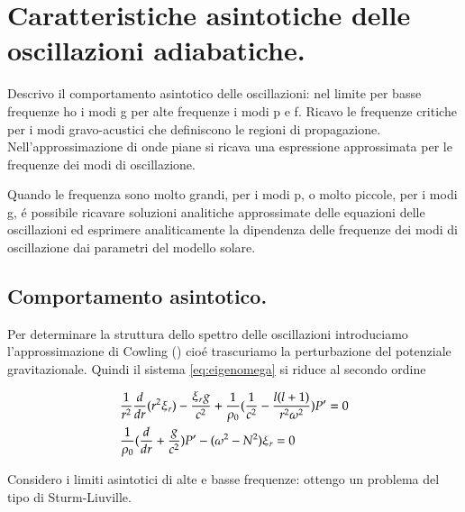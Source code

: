 \documentclass[oneside,12pt]{memoir}
\begin{document}



\chapter{Caratteristiche asintotiche delle oscillazioni adiabatiche.}


Descrivo il comportamento asintotico delle oscillazioni: nel limite per basse frequenze ho i modi g per alte frequenze i modi p e f. Ricavo le frequenze critiche per i modi gravo-acustici che definiscono le regioni di propagazione. Nell'approssimazione di onde piane si ricava una espressione approssimata per le frequenze dei modi di oscillazione.

Quando le frequenza sono molto grandi, per i modi p, o molto piccole, per i modi g, \'e possibile ricavare soluzioni analitiche approssimate delle equazioni delle oscillazioni ed esprimere analiticamente la dipendenza delle frequenze dei modi di oscillazione dai parametri del modello solare.

\section{Comportamento asintotico.}

Per determinare la struttura dello spettro delle oscillazioni introduciamo l'approssimazione di Cowling (\cite{cow41oscillations}) cio\'e trascuriamo la perturbazione del potenziale gravitazionale. Quindi il sistema \eqref{eq:eigenomega} si riduce al secondo ordine

\begin{align}
&\frac{1}{r^2}\frac{d}{d r}(r^2\xi_r)-\frac{\xi_rg}{c^2}+\frac{1}{\rho_0}(\frac{1}{c^2}-\frac{l(l+1)}{r^2\omega^2})P'=0\label{eq:cowosc}\\
&\frac{1}{\rho_0}(\frac{d}{d r}+\frac{g}{c^2})P'-(\omega^2-N^2)\xi_r=0\nonumber
\end{align}

Considero i limiti asintotici di alte e basse frequenze: ottengo un problema del tipo di Sturm-Liuville.
\end{document}
